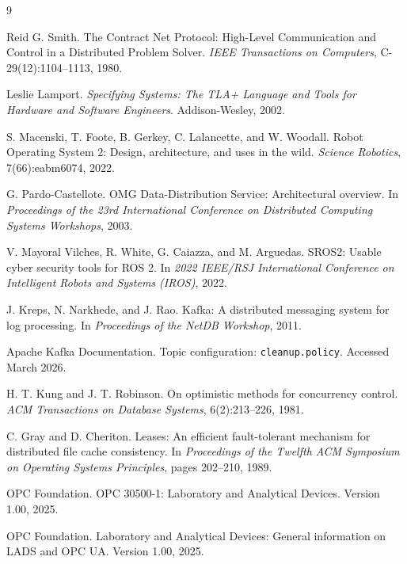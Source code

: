 \documentclass[11pt]{article}
\begin{document}
\begin{thebibliography}{9}

Reid G. Smith.
\newblock The Contract Net Protocol: High-Level Communication and Control in a Distributed Problem Solver.
\newblock \emph{IEEE Transactions on Computers}, C-29(12):1104--1113, 1980.

Leslie Lamport.
\newblock \emph{Specifying Systems: The TLA+ Language and Tools for Hardware and Software Engineers}.
\newblock Addison-Wesley, 2002.

S. Macenski, T. Foote, B. Gerkey, C. Lalancette, and W. Woodall.
\newblock Robot Operating System 2: Design, architecture, and uses in the wild.
\newblock \emph{Science Robotics}, 7(66):eabm6074, 2022.

G. Pardo-Castellote.
\newblock OMG Data-Distribution Service: Architectural overview.
\newblock In \emph{Proceedings of the 23rd International Conference on Distributed Computing Systems Workshops}, 2003.

V. Mayoral Vilches, R. White, G. Caiazza, and M. Arguedas.
\newblock SROS2: Usable cyber security tools for ROS 2.
\newblock In \emph{2022 IEEE/RSJ International Conference on Intelligent Robots and Systems (IROS)}, 2022.

J. Kreps, N. Narkhede, and J. Rao.
\newblock Kafka: A distributed messaging system for log processing.
\newblock In \emph{Proceedings of the NetDB Workshop}, 2011.

Apache Kafka Documentation.
\newblock Topic configuration: \texttt{cleanup.policy}.
\newblock Accessed March 2026.

H. T. Kung and J. T. Robinson.
\newblock On optimistic methods for concurrency control.
\newblock \emph{ACM Transactions on Database Systems}, 6(2):213--226, 1981.

C. Gray and D. Cheriton.
\newblock Leases: An efficient fault-tolerant mechanism for distributed file cache consistency.
\newblock In \emph{Proceedings of the Twelfth ACM Symposium on Operating Systems Principles}, pages 202--210, 1989.

OPC Foundation.
\newblock OPC 30500-1: Laboratory and Analytical Devices.
\newblock Version 1.00, 2025.

OPC Foundation.
\newblock Laboratory and Analytical Devices: General information on LADS and OPC UA.
\newblock Version 1.00, 2025.

\end{thebibliography}
\end{document}
